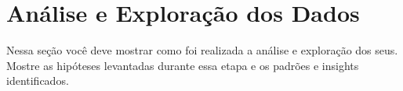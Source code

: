 \chapter{Análise e Exploração dos Dados}

Nessa seção você deve mostrar como foi realizada a análise e exploração dos seus. Mostre as hipóteses levantadas durante essa etapa e os padrões e insights identificados. 